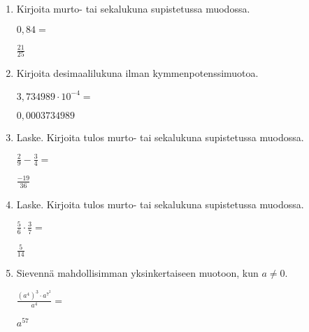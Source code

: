 \documentclass[finnish, a4paper, 12pt]{article}
\begin{document}
	\begin{enumerate}[leftmargin=*]
		\setlength\itemsep{1em}
		
		\item %
		Kirjoita murto- tai sekalukuna supistetussa muodossa. 
		
		\(
		0{,}84 = 
		\) %
		
		\begin{version:withAnswers}
		\( \frac{21}{25} \)
		\end{version:withAnswers}

		\vspace{8pt}
		
		\item %
		Kirjoita desimaalilukuna ilman kymmenpotenssimuotoa. 
		
		\(
		3{,}734989\cdot 10^{-4} = 
		\) %
		\begin{version:withAnswers}
		\( 0,0003734989 \)
		\end{version:withAnswers}	
		\vspace{8pt}
		
		\item %
		Laske. Kirjoita tulos murto- tai sekalukuna supistetussa muodossa.
		
		\(
		\displaystyle
		\frac{2}{9}-\frac{3}{4} = 
		\) %
		\begin{version:withAnswers}
		\( \frac{-19}{36} \)
		\end{version:withAnswers}	
		
		\vspace{8pt}
		
		\item %
		Laske. Kirjoita tulos murto- tai sekalukuna supistetussa muodossa.
		
		\(
		\displaystyle
		\frac{5}{6}\cdot\frac{3}{7} = 
		\) %
		\begin{version:withAnswers}
		\( \frac{5}{14} \)
		\end{version:withAnswers}
		
		\vspace{8pt}
		
		\item %
		Sievennä mahdollisimman yksinkertaiseen muotoon, kun \(a \not = 0\). 
		
		\(
		\displaystyle
		\frac{\left(a^4\right)^3 \cdot a^{7^2}}{a^4} =
		\phantom{mmmmmmmmmmmmmmm}
		\) %
		\begin{version:withAnswers}
		\(  a^{57} \)
		\end{version:withAnswers}
		

\end{enumerate}
\end{document}
